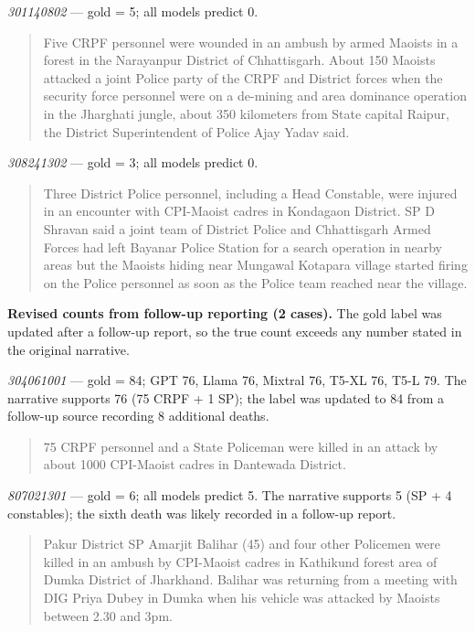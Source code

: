\documentclass[
  11pt,
]{article}
\begin{document}
\smallskip\noindent \emph{301140802} --- gold = 5; all models predict 0.

\begin{quote}
Five CRPF personnel were wounded in an ambush by armed Maoists in a
forest in the Narayanpur District of Chhattisgarh. About 150 Maoists
attacked a joint Police party of the CRPF and District forces when the
security force personnel were on a de-mining and area dominance
operation in the Jharghati jungle, about 350 kilometers from State
capital Raipur, the District Superintendent of Police Ajay Yadav said.
\end{quote}

\noindent \emph{308241302} --- gold = 3; all models predict 0.

\begin{quote}
Three District Police personnel, including a Head Constable, were
injured in an encounter with CPI-Maoist cadres in Kondagaon District. SP
D Shravan said a joint team of District Police and Chhattisgarh Armed
Forces had left Bayanar Police Station for a search operation in nearby
areas but the Maoists hiding near Mungawal Kotapara village started
firing on the Police personnel as soon as the Police team reached near
the village.
\end{quote}

\medskip\noindent \textbf{Revised counts from follow-up reporting (2 cases).}
The gold label was updated after a follow-up report, so the true count
exceeds any number stated in the original narrative.

\smallskip\noindent \emph{304061001} --- gold = 84; GPT 76, Llama 76,
Mixtral 76, T5-XL 76, T5-L 79. The narrative supports 76 (75 CRPF + 1
SP); the label was updated to 84 from a follow-up source recording 8
additional deaths.

\begin{quote}
75 CRPF personnel and a State Policeman were killed in an attack by
about 1000 CPI-Maoist cadres in Dantewada District.
\end{quote}

\noindent \emph{807021301} --- gold = 6; all models predict 5. The
narrative supports 5 (SP + 4 constables); the sixth death was likely
recorded in a follow-up report.

\begin{quote}
Pakur District SP Amarjit Balihar (45) and four other Policemen were
killed in an ambush by CPI-Maoist cadres in Kathikund forest area of
Dumka District of Jharkhand. Balihar was returning from a meeting with
DIG Priya Dubey in Dumka when his vehicle was attacked by Maoists
between 2.30 and 3pm.
\end{quote}
\end{document}
